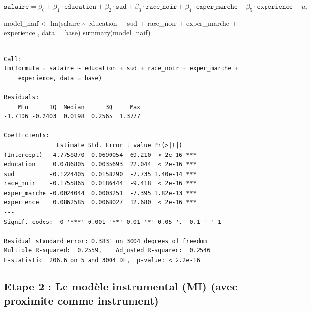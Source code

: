 \documentclass[
  letterpaper,
  DIV=11,
  numbers=noendperiod]{scrartcl}
\newenvironment{Shaded}{\begin{snugshade}}{\end{snugshade}}
\newcommand{\AttributeTok}[1]{\textcolor[rgb]{0.40,0.45,0.13}{#1}}
\newcommand{\FunctionTok}[1]{\textcolor[rgb]{0.28,0.35,0.67}{#1}}
\newcommand{\NormalTok}[1]{\textcolor[rgb]{0.00,0.23,0.31}{#1}}
\newcommand{\OtherTok}[1]{\textcolor[rgb]{0.00,0.23,0.31}{#1}}
\newcommand{\SpecialCharTok}[1]{\textcolor[rgb]{0.37,0.37,0.37}{#1}}
\begin{document}
\[
\texttt{salaire} = \beta_0 + \beta_1 \cdot \texttt{education} + \beta_2 \cdot \texttt{sud} + \beta_3 \cdot \texttt{race_noir} + \beta_4 \cdot \texttt{exper_marche} + \beta_5 \cdot \texttt{experience}+ u_i
\]

\begin{Shaded}
\begin{Highlighting}[]
\NormalTok{model\_naif }\OtherTok{\textless{}{-}} \FunctionTok{lm}\NormalTok{(salaire }\SpecialCharTok{\textasciitilde{}}\NormalTok{ education }\SpecialCharTok{+}\NormalTok{ sud }\SpecialCharTok{+}\NormalTok{ race\_noir }\SpecialCharTok{+}\NormalTok{ exper\_marche }\SpecialCharTok{+}\NormalTok{ experience , }\AttributeTok{data =}\NormalTok{ base)}
\FunctionTok{summary}\NormalTok{(model\_naif)}
\end{Highlighting}
\end{Shaded}

\begin{verbatim}

Call:
lm(formula = salaire ~ education + sud + race_noir + exper_marche + 
    experience, data = base)

Residuals:
    Min      1Q  Median      3Q     Max 
-1.7106 -0.2403  0.0198  0.2565  1.3777 

Coefficients:
               Estimate Std. Error t value Pr(>|t|)    
(Intercept)   4.7758870  0.0690054  69.210  < 2e-16 ***
education     0.0786805  0.0035693  22.044  < 2e-16 ***
sud          -0.1224405  0.0158290  -7.735 1.40e-14 ***
race_noir    -0.1755865  0.0186444  -9.418  < 2e-16 ***
exper_marche -0.0024044  0.0003251  -7.395 1.82e-13 ***
experience    0.0862585  0.0068027  12.680  < 2e-16 ***
---
Signif. codes:  0 '***' 0.001 '**' 0.01 '*' 0.05 '.' 0.1 ' ' 1

Residual standard error: 0.3831 on 3004 degrees of freedom
Multiple R-squared:  0.2559,    Adjusted R-squared:  0.2546 
F-statistic: 206.6 on 5 and 3004 DF,  p-value: < 2.2e-16
\end{verbatim}

\subsection{Etape 2 : Le modèle instrumental (MI) (avec proximite comme
instrument)}\label{etape-2-le-moduxe8le-instrumental-mi-avec-proximite-comme-instrument}
\end{document}
